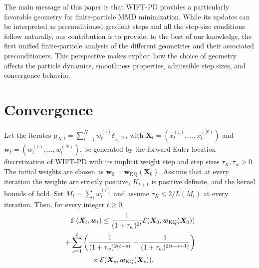 \begin{rem}
The main message of this paper is that WIFT-PD provides a particularly favorable geometry for finite-particle MMD minimization. 
While its updates can be interpreted as preconditioned gradient steps and all the step-size conditions follow naturally, our contribution is to provide, to the best of our knowledge, the first unified finite-particle analysis of the different geometries and their associated preconditioners. 
This perspective makes explicit how the choice of geometry affects the particle dynamics, smoothness properties, admissible step sizes, and convergence behavior.
\end{rem}


\section{Convergence}


\begin{theorem}[Convergence]
\label{thm:wift-convergence}
Let the iterates $\mu_{N,t}=\sum_{i=1}^N w_t^{(i)}\delta_{x_t^{(i)}}$, with $\bm{X}_t=(x_t^{(1)},\ldots,x_t^{(N)})$ and $\bm{w}_t=(w_t^{(1)},\ldots,w_t^{(N)})$, be generated by the forward Euler location discretization of WIFT-PD with its implicit weight step and step sizes $\tau_X,\tau_w>0$. The initial weights are chosen as $\bm{w}_0=\bm{w}_{\mathrm{KQ}}(\bm{X}_0)$.
Assume that at every iteration the weights are strictly positive, $K_{t+1}$ is positive definite, and the kernel bounds of  hold. Set $M_t=\sum_iw_t^{(i)}$ and assume $\tau_X\leq2/L(M_t)$ at every iteration. Then, for every integer $t\geq0$,
\begin{align*}
&\quad \mathcal{E} \left(\bm{X}_t, \bm{w}_t\right) \leq \frac{1}{(1+\tau_w)^{2 t}} \mathcal{E}(\bm{X}_0, \bm{w}_{\mathrm{KQ}}(\bm{X}_0)) \\
& + \sum_{s=1}^t \left( \frac{1}{(1+\tau_w)^{2(t-s)}} - \frac{1}{(1+\tau_w)^{2(t-s+1)}} \right) \\
&\hspace{4em}\times\mathcal{E}(\bm{X}_s, \bm{w}_{\mathrm{KQ}}(\bm{X}_s)).
\end{align*}
\end{theorem}

